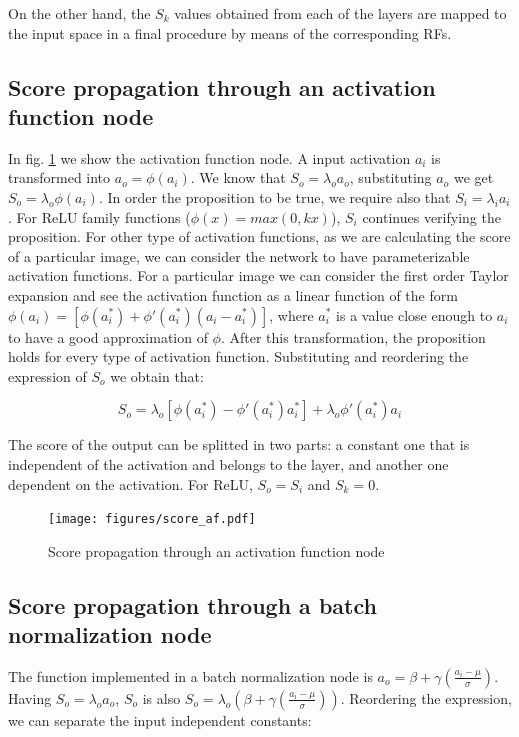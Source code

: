 \documentclass[preprint]{elsarticle}
\theoremstyle{definition} %
\theoremstyle{remark}
\begin{document}
On the other hand, the $S_k$ values obtained from each of the layers are mapped to the input space in a final procedure by means of the corresponding RFs.

\subsection{Score propagation through an activation function node} 

In fig. \ref{fig:score_af} we show the activation function node. A input activation $a_i$ is transformed into $a_o = \phi(a_i)$. We know that $S_o = \lambda_o a_o$, substituting $a_o$ we get $S_o = \lambda_o \phi(a_i)$. In order the proposition to be true, we require also that $S_i = \lambda_i a_i$. For ReLU family functions ($\phi(x) = max(0, kx)$), $S_i$ continues verifying the proposition. For other type of activation functions, as we are calculating the score of a particular image, we can consider the network to have parameterizable activation functions. For a particular image we can consider the first order Taylor expansion and see the activation function as a linear function of the form $\phi(a_i) = [\phi(a^*_i) + \phi'(a^*_i)(a_i - a^*_i)]$, where $a^*_i$ is a value close enough to $a_i$ to have a good approximation of $\phi$. After this transformation, the proposition holds for every type of activation function. Substituting and reordering the expression of $S_o$ we obtain that:

\begin{equation}
	S_o = \lambda_o[\phi(a^*_i) - \phi'(a^*_i)a^*_i] + \lambda_o \phi'(a^*_i)a_i
\end{equation}

The score of the output can be splitted in two parts: a constant one that is independent of the activation and belongs to the layer, and another one dependent on the activation. For ReLU, $S_o = S_i$ and $S_k = 0$.

\begin{figure}[h!]
	\centering
	\texttt{[image: figures/score\_af.pdf]}
	\caption{Score propagation through an activation function node}
	\label{fig:score_af}
\end{figure}

\subsection{Score propagation through a batch normalization node} 

The function implemented in a batch normalization node is $a_o = \beta + \gamma (\frac{a_i - \mu}{\sigma})$. Having $S_o = \lambda_o a_o$, $S_o$ is also $S_o = \lambda_o ( \beta + \gamma (\frac{a_i - \mu}{\sigma}))$. Reordering the expression, we can separate the input independent constants: 
\end{document}
